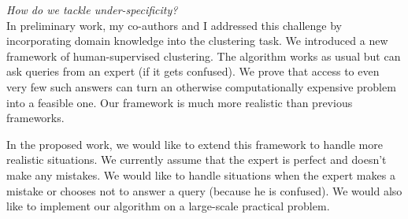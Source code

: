 \documentclass[12pt]{article}
\begin{document}
\begin{enumerate}[noitemsep,leftmargin=*]
\emph{How do we tackle under-specificity?}\\ 
In preliminary work, my co-authors and I addressed this challenge by incorporating domain knowledge into the clustering task. We introduced a new framework of human-supervised clustering. The algorithm works as usual but can ask queries from an expert (if it gets confused). We prove that access to even very few such answers can turn an otherwise computationally expensive problem into a feasible one. Our framework is much more realistic than previous frameworks. 

In the proposed work, we would like to extend this framework to handle more realistic situations. We currently assume that the expert is perfect and doesn't make any mistakes. We would like to handle situations when the expert makes a mistake or chooses not to answer a query (because he is confused). We would also like to implement our algorithm on a large-scale practical problem.
\end{enumerate}
\end{document}
